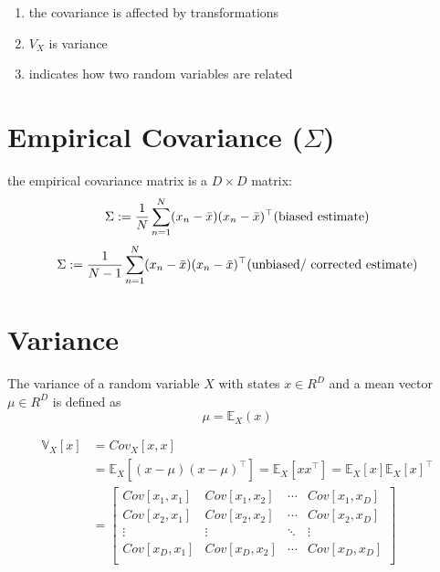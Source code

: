 \begin{enumerate}[itemsep=0.2cm]
\begin{enumerate}
    \end{enumerate}

    \item the covariance is affected by transformations
    
    \item $V_X$ is variance

    \item indicates how two random variables are related

\end{enumerate}

\section{Empirical Covariance ($\Sigma$) \cite{mfml-1}}\label{Multivariate Distributions: Empirical Covariance}

the empirical covariance matrix is a $D\times D$ matrix:
\[
    \Sigma
    := \dfrac{1}{N}
    \dsum_{n=1}^{N}
    (x_n - \bar{x})(x_n - \bar{x})^\top
    \hfill
    \text{(biased estimate)}
\]
\[
    \Sigma
    := \dfrac{1}{N-1}
    \dsum_{n=1}^{N}
    (x_n - \bar{x})(x_n - \bar{x})^\top
    \hfill
    \text{(unbiased/ corrected estimate)}
\]


\section{Variance \cite{mfml-1}}\label{Multivariate Distributions: Variance}

The variance of a random variable $X$ with states $x \in R^D$ and a mean vector $\mu \in R^D$ is defined as
\[
    \mu = \mathbb{E}_X(x)
\]

\begin{align*}
    \mathbb{V}_X[x] 
    &= Cov_X[x,x]\\
    &= \mathbb{E}_X[(x-\mu)(x-\mu)^\top]
    = \mathbb{E}_X[xx^\top]
    = \mathbb{E}_X[x]\mathbb{E}_X[x]^\top\\
    &= \begin{bmatrix}
        Cov[x_1,x_1] & Cov[x_1,x_2] & \cdots & Cov[x_1,x_D]\\
        Cov[x_2,x_1] & Cov[x_2,x_2] & \cdots & Cov[x_2,x_D]\\
        \vdots & \vdots & \ddots & \vdots \\
        Cov[x_D,x_1] & Cov[x_D,x_2] & \cdots & Cov[x_D,x_D]\\
    \end{bmatrix}
\end{align*}

